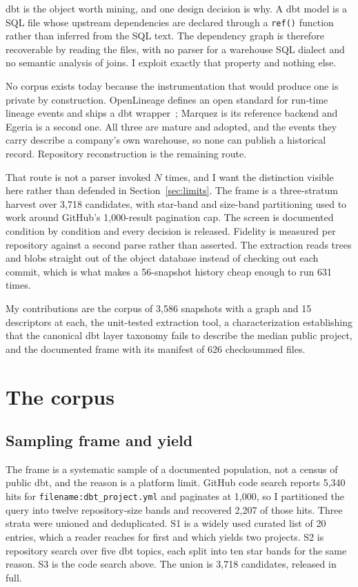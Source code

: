 \documentclass[10pt,conference]{IEEEtran}
\begin{document}
dbt is the object worth mining, and one design decision is why. A dbt model is a
SQL file whose upstream dependencies are declared through a \texttt{ref()}
function rather than inferred from the SQL text. The dependency graph is
therefore recoverable by reading the files, with no parser for a warehouse SQL
dialect and no semantic analysis of joins. I exploit exactly that property and
nothing else.

No corpus exists today because the instrumentation that would produce one is
private by construction. OpenLineage defines an open standard for run-time
lineage events and ships a dbt wrapper~\cite{openlineage}; Marquez is its
reference backend and Egeria is a second one. All three are mature and adopted,
and the events they carry describe a company's own warehouse, so none can
publish a historical record. Repository reconstruction is the remaining route.

That route is not a parser invoked $N$ times, and I want the distinction visible
here rather than defended in Section~\ref{sec:limits}. The frame is a
three-stratum harvest over 3{,}718 candidates, with star-band and size-band
partitioning used to work around GitHub's 1{,}000-result pagination cap. The
screen is documented condition by condition and every decision is released.
Fidelity is measured per repository against a second parse rather than asserted.
The extraction reads trees and blobs straight out of the object database instead
of checking out each commit, which is what makes a 56-snapshot history cheap
enough to run 631 times.

My contributions are the corpus of 3{,}586 snapshots with a graph and 15
descriptors at each, the unit-tested extraction tool, a characterization
establishing that the canonical dbt layer taxonomy fails to describe the median
public project, and the documented frame with its manifest of 626 checksummed
files.

\section{The corpus}

\subsection{Sampling frame and yield}
\label{sec:frame}

The frame is a systematic sample of a documented population, not a census of
public dbt, and the reason is a platform limit. GitHub code search reports
5{,}340 hits for \texttt{filename:dbt\_project.yml} and paginates at 1{,}000, so
I partitioned the query into twelve repository-size bands and recovered 2{,}207
of those hits. Three strata were unioned and deduplicated. S1 is a widely used
curated list of 20 entries, which a reader reaches for first and which yields
two projects. S2 is repository search over five dbt topics, each split into ten
star bands for the same reason. S3 is the code search above. The union is
3{,}718 candidates, released in full.
\end{document}
